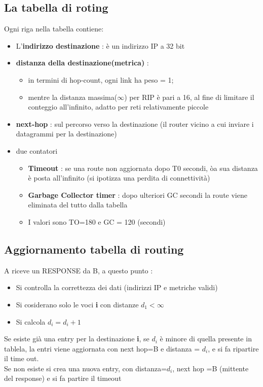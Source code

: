 \documentclass{report}
\begin{document}
            \subsection{La tabella di roting}
                Ogni riga nella tabella contiene:
                \begin{itemize}
                    \item L'\textbf{indirizzo destinazione} : è un indirizzo IP a 32 bit
                    \item \textbf{distanza della destinazione(metrica)} : 
                        \begin{itemize}
                            \item in termini di hop-count, ogni link ha peso = 1;
                            \item mentre la distanza massima($\infty$) per RIP è pari a 16, 
                            al fine di limitare il conteggio all'infinito, adatto per reti relativamente piccole
                        \end{itemize}
                    \item \textbf{next-hop} : sul percorso verso la destinazione (il router vicino a cui inviare i datagrammi per la destinazione)
                    \item due contatori
                        \begin{itemize}
                            \item \textbf{Timeout} : se una route non aggiornata dopo T0 secondi, òa sua distanza è posta all'infinito (si ipotizza una perdita di connettività)
                            \item \textbf{Garbage Collector timer} : dopo ulteriori GC secondi la route viene eliminata del tutto dalla tabella
                            \item I valori sono TO=180 e GC = 120 (secondi)
                        \end{itemize}
                \end{itemize}
            \subsection{Aggiornamento tabella di routing}
                A riceve un RESPONSE da B, a questo punto :
                \begin{itemize}
                    \item Si controlla la correttezza dei dati (indirizzi IP e metriche validi)
                    \item Si cosiderano solo le voci \textbf{i} con distanze $d_1<\infty$
                    \item Si calcola $d_i=d_i+1$
                \end{itemize}
                Se esiste già una entry per la destinazione \textbf{i}, se $d_i$ è minore di quella presente in tablela, la entri viene aggiornata con next hop=B e distanza = $d_i$, e si fa ripartire il time out.
                \\
                Se non esiste si crea una nuova entry, con distanza=$d_i$, next hop =B (mittente del response) e si fa partire il timeout
\end{document}

